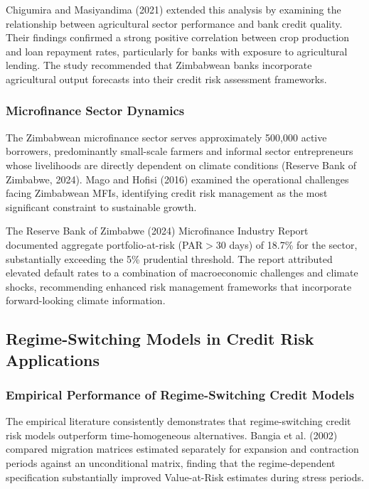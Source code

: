 \documentclass[12pt,a4paper]{article}
\begin{document}
Chigumira and Masiyandima (2021) extended this analysis by examining the relationship between agricultural sector performance and bank credit quality. Their findings confirmed a strong positive correlation between crop production and loan repayment rates, particularly for banks with exposure to agricultural lending. The study recommended that Zimbabwean banks incorporate agricultural output forecasts into their credit risk assessment frameworks.

\subsubsection{Microfinance Sector Dynamics}

The Zimbabwean microfinance sector serves approximately 500,000 active borrowers, predominantly small-scale farmers and informal sector entrepreneurs whose livelihoods are directly dependent on climate conditions (Reserve Bank of Zimbabwe, 2024). Mago and Hofisi (2016) examined the operational challenges facing Zimbabwean MFIs, identifying credit risk management as the most significant constraint to sustainable growth.

The Reserve Bank of Zimbabwe (2024) Microfinance Industry Report documented aggregate portfolio-at-risk (PAR$>$30 days) of 18.7\% for the sector, substantially exceeding the 5\% prudential threshold. The report attributed elevated default rates to a combination of macroeconomic challenges and climate shocks, recommending enhanced risk management frameworks that incorporate forward-looking climate information.

\subsection{Regime-Switching Models in Credit Risk Applications}

\subsubsection{Empirical Performance of Regime-Switching Credit Models}

The empirical literature consistently demonstrates that regime-switching credit risk models outperform time-homogeneous alternatives. Bangia et al. (2002) compared migration matrices estimated separately for expansion and contraction periods against an unconditional matrix, finding that the regime-dependent specification substantially improved Value-at-Risk estimates during stress periods.
\end{document}
